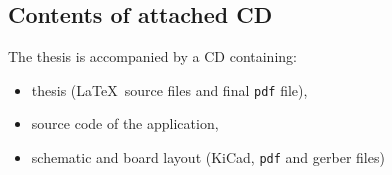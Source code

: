 \documentclass[a4paper,twoside,12pt]{book}
\begin{document}
\begin{appendices}
\chapter*{Contents of attached CD}

The thesis is accompanied by a CD containing:
\begin{itemize}
\item thesis (\LaTeX\ source files and final \texttt{pdf} file),
\item source code of the application,
\item schematic and board layout (KiCad, \texttt{pdf} and gerber files)
\end{itemize}

\listoffigures

\end{appendices}
\end{document}
